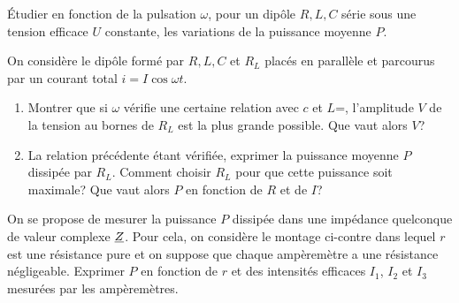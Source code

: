 \begin{exercice}%
  Étudier en fonction de la pulsation \(\omega\), pour un dipôle \(R, L, C\) 
  série sous une tension efficace \(U\) constante, les variations de la 
  puissance moyenne \(P\).
\end{exercice}%
\begin{exercice}%
  On considère le dipôle formé par \(R, L, C\) et \(R_L\) placés en parallèle 
  et parcourus par un courant total \(i = I\cos\omega t\).
  \begin{enumerate}
    \item Montrer que si \(\omega\) vérifie une certaine relation avec \(c\) et 
      \(L\)=, l'amplitude \(V\) de la tension au bornes de \(R_L\) est la plus 
      grande possible. Que vaut alors \(V\)?
    \item La relation précédente étant vérifiée, exprimer la puissance moyenne 
      \(P\) dissipée par \(R_L\). Comment choisir \(R_L\) pour que cette 
      puissance soit maximale? Que vaut alors \(P\) en fonction de \(R\) et de 
      \(I\)?
  \end{enumerate}
\end{exercice}%
\begin{exercice}%
  On se propose de mesurer la puissance \(P\) dissipée dans une impédance 
  quelconque de valeur complexe \(\underline{Z}\). Pour cela, on considère le montage 
  ci-contre dans lequel \(r\) est une résistance pure et on suppose que chaque 
  ampèremètre a une résistance négligeable. Exprimer \(P\) en fonction de \(r\) 
  et des intensités efficaces \(I_1\), \(I_2\) et \(I_3\) mesurées par les 
  ampèremètres.
\end{exercice}%
